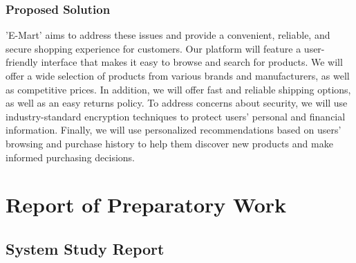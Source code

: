 \documentclass[11pt]{report}
\begin{document}
\subsection{Proposed Solution}
'E-Mart' aims to address these issues and provide a convenient, reliable, and secure shopping experience for customers. Our platform will feature a user-friendly interface that makes it easy to browse and search for products. We will offer a wide selection of products from various brands and manufacturers, as well as competitive prices. In addition, we will offer fast and reliable shipping options, as well as an easy returns policy. To address concerns about security, we will use industry-standard encryption techniques to protect users' personal and financial information. Finally, we will use personalized recommendations based on users' browsing and purchase history to help them discover new products and make informed purchasing decisions.
\chapter{\label{work}Report of Preparatory Work }
\section{System Study Report}
\end{document}
